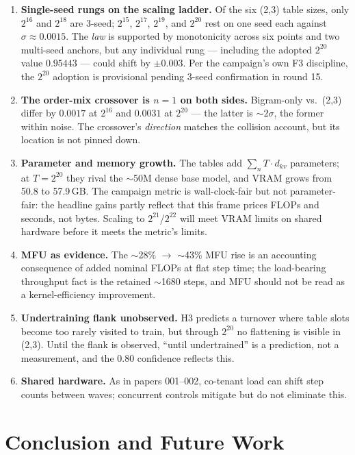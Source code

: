 \documentclass{article}
\begin{document}
\begin{enumerate}
    \item \textbf{Single-seed rungs on the scaling ladder.} Of the six (2,3) table sizes, only $2^{16}$ and $2^{18}$ are 3-seed; $2^{15}$, $2^{17}$, $2^{19}$, and $2^{20}$ rest on one seed each against $\sigma \approx 0.0015$. The \emph{law} is supported by monotonicity across six points and two multi-seed anchors, but any individual rung --- including the adopted $2^{20}$ value $0.95443$ --- could shift by $\pm 0.003$. Per the campaign's own F3 discipline, the $2^{20}$ adoption is provisional pending 3-seed confirmation in round 15.
    \item \textbf{The order-mix crossover is $n{=}1$ on both sides.} Bigram-only vs.\ (2,3) differ by $0.0017$ at $2^{16}$ and $0.0031$ at $2^{20}$ --- the latter is $\sim 2\sigma$, the former within noise. The crossover's \emph{direction} matches the collision account, but its location is not pinned down.
    \item \textbf{Parameter and memory growth.} The tables add $\sum_n T \cdot d_{kv}$ parameters; at $T = 2^{20}$ they rival the $\sim$50M dense base model, and VRAM grows from 50.8 to 57.9\,GB. The campaign metric is wall-clock-fair but not parameter-fair: the headline gains partly reflect that this frame prices FLOPs and seconds, not bytes. Scaling to $2^{21}$/$2^{22}$ will meet VRAM limits on shared hardware before it meets the metric's limits.
    \item \textbf{MFU as evidence.} The $\sim$28\% $\rightarrow$ $\sim$43\% MFU rise is an accounting consequence of added nominal FLOPs at flat step time; the load-bearing throughput fact is the retained $\sim$1680 steps, and MFU should not be read as a kernel-efficiency improvement.
    \item \textbf{Undertraining flank unobserved.} H3 predicts a turnover where table slots become too rarely visited to train, but through $2^{20}$ no flattening is visible in (2,3). Until the flank is observed, ``until undertrained'' is a prediction, not a measurement, and the $0.80$ confidence reflects this.
    \item \textbf{Shared hardware.} As in papers 001--002, co-tenant load can shift step counts between waves; concurrent controls mitigate but do not eliminate this.
\end{enumerate}

\section{Conclusion and Future Work}
\label{sec:conclusion}
\end{document}
